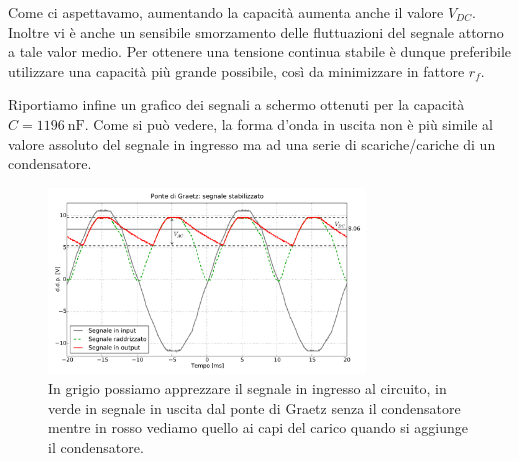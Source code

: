 Come ci aspettavamo, aumentando la capacità aumenta anche il valore $V_{DC}$. Inoltre vi è anche un sensibile smorzamento delle fluttuazioni del segnale attorno a tale valor medio. Per ottenere una tensione continua stabile è dunque preferibile utilizzare una capacità più grande possibile, così da minimizzare in fattore $r_f$.

Riportiamo infine un grafico dei segnali a schermo ottenuti per la capacità $C=\SI{1196}{\nano\farad}$. Come si può vedere, la forma d'onda in uscita non è più simile al valore assoluto del segnale in ingresso ma ad una serie di scariche/cariche di un condensatore.

\begin{figure}[h]
\center
	\includegraphics[width=0.75\textwidth]{ripple.pdf}
	\caption{In grigio possiamo apprezzare il segnale in ingresso al circuito, in verde in segnale in uscita dal ponte di Graetz senza il condensatore mentre in rosso vediamo quello ai capi del carico quando si aggiunge il condensatore.}
	\label{fig:ripple}
\end{figure}